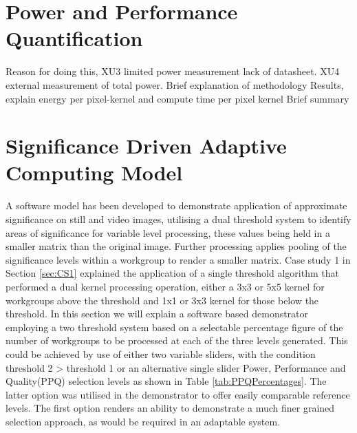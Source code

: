 \documentclass[journal]{IEEEtran}
\begin{document}
\section{Power and Performance Quantification}
Reason for doing this, XU3 limited power measurement lack of datasheet. XU4 external measurement of total power. 
Brief explanation of methodology
Results, explain energy per pixel-kernel and compute time per pixel kernel
Brief summary

\section{Significance Driven Adaptive Computing Model}
A software model has been developed to demonstrate application of approximate significance on still and video images, utilising a dual threshold system to identify areas of significance for variable level processing, these values being held in a smaller matrix than the original image. Further processing applies pooling of the significance levels within a workgroup to render a smaller matrix.
Case study 1 in Section \ref{sec:CS1} explained the application of a single threshold algorithm that performed a dual kernel processing operation, either a 3x3 or 5x5 kernel for workgroups above the threshold and 1x1 or 3x3 kernel for those below the threshold. In this section we will explain a software based demonstrator employing a two threshold system based on a selectable percentage figure of the number of workgroups to be processed at each of the three levels generated. This could be achieved by use of either two variable sliders, with the condition threshold 2 > threshold 1 or an alternative single slider Power, Performance and Quality(PPQ) selection levels as shown in Table \ref{tab:PPQPercentages}. The latter option was utilised in the demonstrator to offer easily comparable reference levels. The first option renders an ability to demonstrate a much finer grained selection approach, as would be required in an adaptable system.
\end{document}
